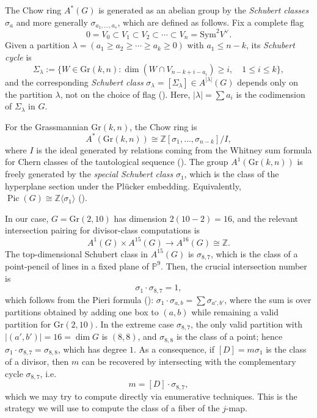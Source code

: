 \documentclass[11pt]{article}
\newcommand{\G}{\mathrm{Gr}}
\newcommand{\Pj}{\mathbb P}
\newcommand{\Sym}{\mathrm{Sym}}
\begin{document}
The Chow ring $A^*(G)$ is generated as an abelian group by the \emph{Schubert classes} $\sigma_a$ and more generally $\sigma_{a_1,\ldots,a_s}$, which are defined as follows. Fix a complete flag
\[
0 = V_0 \subset V_1 \subset V_2 \subset \cdots \subset V_n = \Sym^2 V^\vee.
\]
Given a partition $\lambda=(a_1\geq a_2\geq \cdots \geq a_k\geq 0)$ with $a_1\leq n-k$, its \emph{Schubert cycle} is
\[
\Sigma_\lambda := \{ W \in \G(k,n) : \dim(W \cap V_{n-k+i-a_i}) \geq i, \quad 1\leq i\leq k \},
\]
and the corresponding \emph{Schubert class} $\sigma_\lambda=[\Sigma_\lambda]\in A^{|\lambda|}(G)$ depends only on the partition $\lambda$, not on the choice of flag (\cite[Theorem~4.2]{EH}). Here, $|\lambda|=\sum a_i$ is the codimension of $\Sigma_\lambda$ in $G$.

For the Grassmannian $\G(k,n)$, the Chow ring is
\[
A^*(\G(k,n)) \cong \mathbb{Z}[\sigma_1,\ldots,\sigma_{n-k}] / I,
\]
where $I$ is the ideal generated by relations coming from the Whitney sum formula for Chern classes of the tautological sequence (\cite[Chapter~5]{EH}). The group $A^1(\G(k,n))$ is freely generated by the \emph{special Schubert class} $\sigma_1$, which is the class of the hyperplane section under the Pl\"ucker embedding. Equivalently, $\operatorname{Pic}(G)\cong \mathbb{Z} \langle \sigma_1 \rangle$ (\cite[Proposition~4.3]{EH}).

In our case, $G=\G(2,10)$ has dimension $2(10-2)=16$, and the relevant intersection pairing for divisor-class computations is
\[
A^1(G) \times A^{15}(G) \to A^{16}(G) \cong \mathbb{Z}.
\]
The top-dimensional Schubert class in $A^{15}(G)$ is $\sigma_{8,7}$, which is the class of a point-pencil of lines in a fixed plane of $\Pj^9$. Then, the crucial intersection number is
\[
\sigma_1 \cdot \sigma_{8,7} = 1,
\]
which follows from the Pieri formula (\cite[Theorem~4.7]{EH}): $\sigma_1\cdot \sigma_{a,b}=\sum \sigma_{a',b'}$, where the sum is over partitions obtained by adding one box to $(a,b)$ while remaining a valid partition for $\G(2,10)$. In the extreme case $\sigma_{8,7}$, the only valid partition with $|(a',b')|=16=\dim G$ is $(8,8)$, and $\sigma_{8,8}$ is the class of a point; hence $\sigma_1\cdot\sigma_{8,7}=\sigma_{8,8}$, which has degree $1$. As a consequence, if $[D]=m\sigma_1$ is the class of a divisor, then $m$ can be recovered by intersecting with the complementary cycle $\sigma_{8,7}$, i.e.
\[
m = [D] \cdot \sigma_{8,7},
\]
which we may try to compute directly via enumerative techniques. This is the strategy we will use to compute the class of a fiber of the $j$-map.
\end{document}

